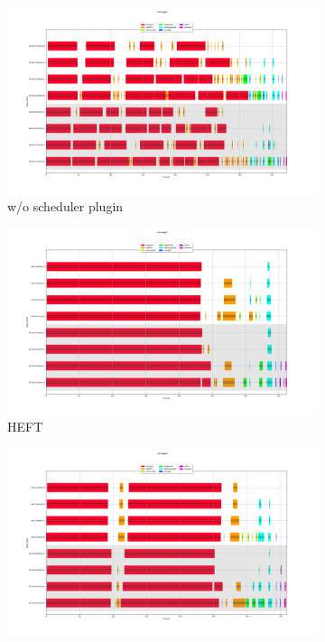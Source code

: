 \begin{figure}[H]
\begin{subfigure}{0.75\textwidth}
\centering
\includegraphics[width=1\linewidth]{figures/6-2-m0.25-agglo-empty.png}
\caption[Selected example execution trace for Montage2-v0.25 workflow with task clustering and no scheduler plugin]{w/o scheduler plugin}
\label{fig:evaluation:agglo:m025:empty}
\end{subfigure}
\begin{subfigure}{0.75\textwidth}
\centering
\includegraphics[width=1\linewidth]{figures/6-2-m0.25-agglo-heft.png}
\caption[Selected example execution traces for Montage2-v0.25 workflow with HEFT and task clustering]{HEFT}
\label{fig:evaluation:agglo:m025:heft}
\end{subfigure}
\begin{subfigure}{0.75\textwidth}
\centering
\includegraphics[width=1\linewidth]{figures/6-2-m0.25-agglo-peft.png}

\end{subfigure}
\end{figure}
